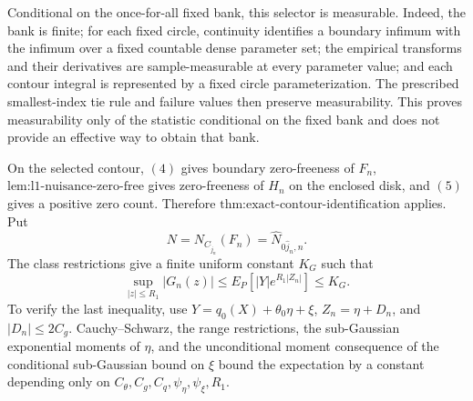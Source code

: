 Conditional on the once-for-all fixed bank, this selector is measurable.  Indeed, the bank is finite; for each fixed circle, continuity identifies a boundary infimum with the infimum over a fixed countable dense parameter set; the empirical transforms and their derivatives are sample-measurable at every parameter value; and each contour integral is represented by a fixed circle parameterization.  The prescribed smallest-index tie rule and failure values then preserve measurability.  This proves measurability only of the statistic conditional on the fixed bank and does not provide an effective way to obtain that bank.

On the selected contour, \((4)\) gives boundary zero-freeness of \(F_n\), \(\text{lem:l1-nuisance-zero-free}\) gives zero-freeness of \(H_n\) on the enclosed disk, and \((5)\) gives a positive zero count.  Therefore \(\text{thm:exact-contour-identification}\) applies.  Put
\[
 N=N_{C_{\widehat j_n}}(F_n)
  =\widehat N_{0\widehat j_n,n}.
\]
The class restrictions give a finite uniform constant \(K_G\) such that
\[
 \sup_{|z|\le R_1}|G_n(z)|
 \le E_P[|Y|e^{R_1|Z_n|}]
 \le K_G. \tag{7}
\]
To verify the last inequality, use \(Y=q_0(X)+\theta_0\eta+\xi\), \(Z_n=\eta+D_n\), and \(|D_n|\le2C_g\).  Cauchy--Schwarz, the range restrictions, the sub-Gaussian exponential moments of \(\eta\), and the unconditional moment consequence of the conditional sub-Gaussian bound on \(\xi\) bound the expectation by a constant depending only on \(C_{\theta},C_g,C_q,\psi_{\eta},\psi_{\xi},R_1\).

